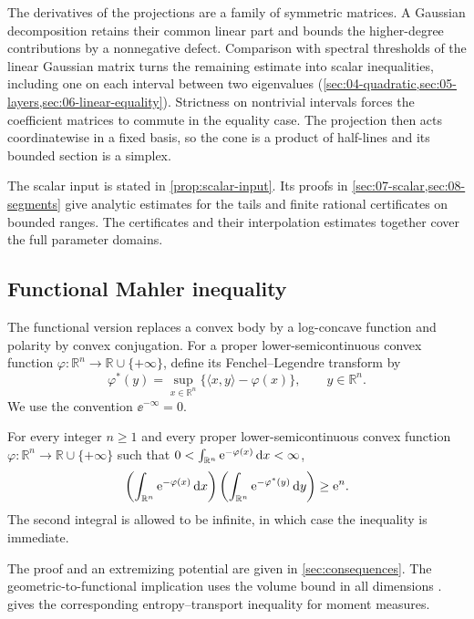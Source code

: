The derivatives of the projections are a family of symmetric matrices. A Gaussian decomposition retains their common linear part and bounds the higher-degree contributions by a nonnegative defect. Comparison with spectral thresholds of the linear Gaussian matrix turns the remaining estimate into scalar inequalities, including one on each interval between two eigenvalues (\cref{sec:04-quadratic,sec:05-layers,sec:06-linear-equality}). Strictness on nontrivial intervals forces the coefficient matrices to commute in the equality case. The projection then acts coordinatewise in a fixed basis, so the cone is a product of half-lines and its bounded section is a simplex.

The scalar input is stated in \cref{prop:scalar-input}. Its proofs in \cref{sec:07-scalar,sec:08-segments} give analytic estimates for the tails and finite rational certificates on bounded ranges. The certificates and their interpolation estimates together cover the full parameter domains.

\subsection*{Functional Mahler inequality}

The functional version replaces a convex body by a log-concave function and polarity by convex conjugation. For a proper lower-semicontinuous convex function $\varphi:\mathbb{R}^n\to\mathbb{R}\cup\{+\infty\}$, define its Fenchel--Legendre transform by
\[
 \varphi^*(y)=\sup_{x\in\mathbb{R}^n}\{\langle x,y\rangle-\varphi(x)\},
 \qquad y\in\mathbb{R}^n.
\]
We use the convention $\ee^{-\infty}=0$.

\begin{corollary}\label{cor:functional-mahler}
For every integer $n\ge1$ and every proper lower-semicontinuous convex function $\varphi:\mathbb{R}^n\to\mathbb{R}\cup\{+\infty\}$ such that $0<\int_{\mathbb{R}^n}\mathrm{e}^{-\varphi(x)}\,\mathrm{d} x<\infty$,
\[
 \left(\int_{\mathbb{R}^n}\mathrm{e}^{-\varphi(x)}\,\mathrm{d} x\right)
 \left(\int_{\mathbb{R}^n}\mathrm{e}^{-\varphi^*(y)}\,\mathrm{d} y\right)\ge \mathrm{e}^n.
\]
The second integral is allowed to be infinite, in which case the inequality is immediate.
\end{corollary}


The proof and an extremizing potential are given in \cref{sec:consequences}. The geometric-to-functional implication uses the volume bound in all dimensions \cite[Proposition~2(a)]{FradeliziMeyer2008}.  gives the corresponding entropy--transport inequality for moment measures.
